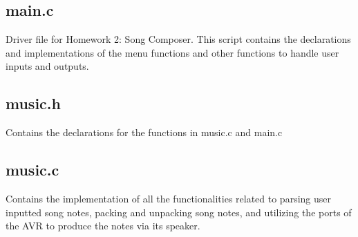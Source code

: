\documentclass[usletter, 12pt]{article}
\begin{document}
        \subsection{main.c}
        Driver file for Homework 2: Song Composer. This script contains the declarations and implementations of the menu functions and other functions to handle user inputs and outputs.

        \subsection{music.h}
        Contains the declarations for the functions in music.c and main.c

        \subsection{music.c}
        Contains the implementation of all the functionalities related to parsing user inputted song notes, packing and unpacking song notes, and utilizing the ports of the AVR to produce the notes via its speaker.
\end{document}
